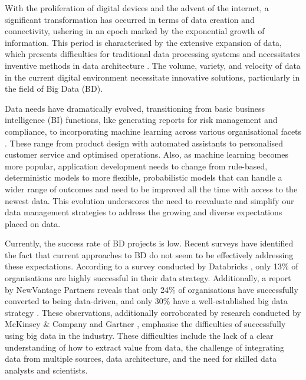 \documentclass[review]{elsarticle}
\begin{document}
\label{sec:introduction} 

With the proliferation of digital devices and the advent of the internet, a significant transformation has occurred in terms of data creation and connectivity, ushering in an epoch marked by the exponential growth of information. This period is characterised by the extensive expansion of data, which presents difficulties for traditional data processing systems and necessitates inventive methods in data architecture \cite{AtaeiACIS, ataei2022state}. The volume, variety, and velocity of data in the current digital environment necessitate innovative solutions, particularly in the field of Big Data (BD).

Data needs have dramatically evolved, transitioning from basic business intelligence (BI) functions, like generating reports for risk management and compliance, to incorporating machine learning across various organisational facets \cite{ataei2023towards}. These range from product design with automated assistants to personalised customer service and optimised operations.  Also, as machine learning becomes more popular, application development needs to change from rule-based, deterministic models to more flexible, probabilistic models that can handle a wider range of outcomes and need to be improved all the time with access to the newest data. This evolution underscores the need to reevaluate and simplify our data management strategies to address the growing and diverse expectations placed on data.

Currently, the success rate of BD projects is low. Recent surveys have identified the fact that current approaches to BD do not seem to be effectively addressing these expectations. According to a survey conducted by Databricks \cite{DataBricksSurvey}, only 13\% of organisations are highly successful in their data strategy. Additionally, a report by NewVantage Partners reveals that only 24\% of organisations have successfully converted to being data-driven, and only 30\% have a well-established big data strategy \cite{newvantagepartners2023}. These observations, additionally corroborated by research conducted by McKinsey \& Company \cite{analytics2016age} and Gartner \cite{Nash}, emphasise the difficulties of successfully using big data in the industry. These difficulties include the lack of a clear understanding of how to extract value from data, the challenge of integrating data from multiple sources, data architecture, and the need for skilled data analysts and scientists. 
\end{document}
